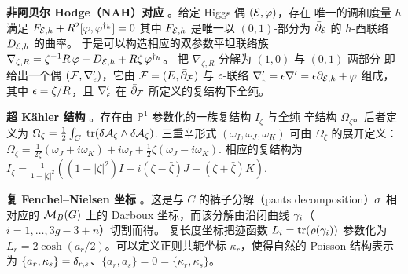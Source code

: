 {\bf 非阿贝尔 Hodge（NAH）对应} \cite{Hi87,Si}。给定 Higgs 偶 $(\mathcal{E},\varphi)$，存在
唯一的调和度量 $h$ 满足
$F_{\mathcal{E},h}+R^2[\varphi,\varphi^{\dagger_h}]=0$
其中 $F_{\mathcal{E},h}$ 是唯一以
$(0,1)$-部分为 $\bar{\partial}_{\mathcal{E}}$ 的 $h$-酉联络 $D_{\mathcal{E},h}$ 的曲率。
于是可以构造相应的双参数平坦联络族
$\nabla_{\zeta,R}=\zeta^{-1}{R}\,\varphi+D_{\mathcal{E},h}+R\zeta\,\varphi^{\dagger_h}$。
把 $\nabla_{\zeta,R}$ 分解为 $(1,0)$ 与 $(0,1)$-两部分 %
即给出一个偶 $(\mathcal{F},\nabla_\epsilon')$，它由
$\mathcal{F}=(E,\bar{\partial}_{\mathcal{F}})$ 与 $\epsilon$-联络
$\nabla_\epsilon'=\epsilon\nabla'=\epsilon\partial_{\mathcal{E},h}+\varphi$ 组成，其中 $\epsilon=\zeta/R$，且 $\nabla_\epsilon'$ 在
$\bar{\partial}_{\mathcal{F}}$ 所定义的复结构下全纯。

{\bf 超 K\"ahler 结构} \cite{Hi87}。存在由 $\mathbb{P}^1$ 参数化的一族复结构 $I_\zeta$ 与全纯
辛结构 $\Omega_\zeta$。后者定义为
$
\Omega_\zeta =\frac{1}{2}\int_C\;{\rm tr}(\delta\mathcal{A}_\zeta\wedge\delta\mathcal{A}_\zeta)
$.
三重辛形式 $(\omega_I,\omega_J,\omega_K)$ 可由 $\Omega_\zeta$ 的展开定义：
$
\Omega_\zeta=\frac{1}{2\zeta}(\omega_J+i\omega_K)+i\omega_I+\frac{1}{2}{\zeta}(\omega_J-i\omega_K).
$
相应的复结构为
$
I_{\zeta}=\frac{1}{1+|\zeta|^2}((1-|\zeta|^2)I-i(\zeta-\bar{\zeta})J-(\zeta+\bar{\zeta})K).
$

{\bf 复 Fenchel--Nielsen 坐标} \cite{NRS}。这是与 $C$ 的裤子分解（pants decomposition）$\sigma$ 相对应的 $\mathcal{M}_{B}(G)$ 上的 Darboux 坐标，而该分解由沿闭曲线 $\gamma_i$（$i=1,\dots,3g-3+n$）切割而得。
复长度坐标把迹函数 $L_i=\mathrm{tr}(\rho(\gamma_i))$ 参数化为 $L_r=2\cosh(a_r/2)$。可以定义正则共轭坐标
$\kappa_r$，使得自然的 Poisson 结构表示为
$\{a_r,\kappa_s\}=\delta_{r,s}$、$\{a_r,a_s\}=0=\{\kappa_r,\kappa_s\}$。

